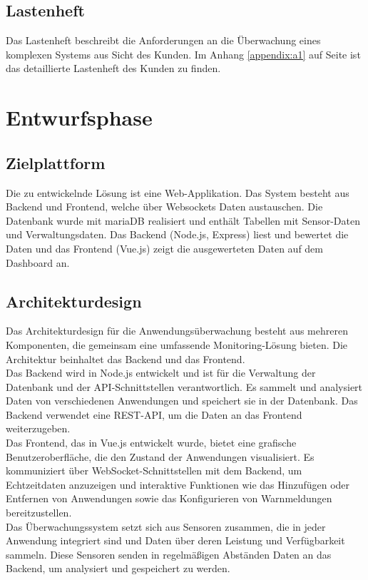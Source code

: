 \begin{flushleft}
		\subsection{Lastenheft}
			Das Lastenheft beschreibt die Anforderungen an die Überwachung eines komplexen Systems aus Sicht des Kunden.
			Im Anhang \ref{appendix:a1} auf Seite \pageref{appendix:a1} ist das detaillierte Lastenheft des Kunden zu finden.



	\section{Entwurfsphase}

		\subsection{Zielplattform}
			Die zu entwickelnde Lösung ist eine Web-Applikation.
			Das System besteht aus Backend und Frontend, welche über Websockets Daten austauschen.
			Die Datenbank wurde mit \acs{mariaDB} realisiert und enthält Tabellen mit Sensor-Daten und Verwaltungsdaten.
			Das Backend (Node.js, Express) liest und bewertet die Daten und das Frontend (Vue.js) zeigt die ausgewerteten Daten auf dem Dashboard an.

		\subsection{Architekturdesign}
			Das Architekturdesign für die Anwendungsüberwachung besteht aus mehreren Komponenten, die gemeinsam eine umfassende Monitoring-Lösung bieten. Die Architektur beinhaltet das Backend und das Frontend.
			\\
			Das Backend wird in Node.js entwickelt und ist für die Verwaltung der Datenbank und der \acs{API}-Schnittstellen verantwortlich. Es sammelt und analysiert Daten von verschiedenen Anwendungen und speichert sie in der Datenbank. Das Backend verwendet eine \acs{REST-API}, um die Daten an das Frontend weiterzugeben.
			\\
			Das Frontend, das in Vue.js entwickelt wurde, bietet eine grafische Benutzeroberfläche, die den Zustand der Anwendungen visualisiert. Es kommuniziert über WebSocket-Schnittstellen mit dem Backend, um Echtzeitdaten anzuzeigen und interaktive Funktionen wie das Hinzufügen oder Entfernen von Anwendungen sowie das Konfigurieren von Warnmeldungen bereitzustellen.
			\\
			Das Überwachungssystem setzt sich aus Sensoren zusammen, die in jeder Anwendung integriert sind und Daten über deren Leistung und Verfügbarkeit sammeln. Diese Sensoren senden in regelmäßigen Abständen Daten an das Backend, um analysiert und gespeichert zu werden.


\end{flushleft}
